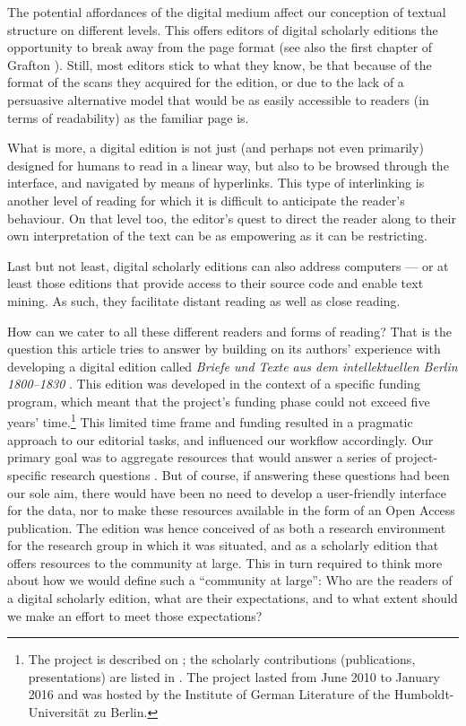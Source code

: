 \begin{paper}
The potential affordances of the digital medium affect our conception of
textual structure on different levels. This offers editors of digital scholarly
editions the opportunity to break away from the
page format (see also the first chapter of Grafton \citeyear{grafton_page_2012}). Still,  most editors stick to what they know, be that because of the format of the
scans they acquired for the edition, or due to the lack of a persuasive alternative model that would be as easily
accessible to readers (in terms of readability) as the familiar page
is.

What is more, a digital edition is not just (and perhaps not even primarily)
designed for humans to read in a linear way, but also to be browsed through the
interface, and navigated by means of hyperlinks. This type of interlinking is
another level of reading for which it is difficult to anticipate  the reader's behaviour. On that level too, the editor's quest to direct the reader
along to their own interpretation of the text can be as empowering as it
can be restricting.

Last but not least, digital scholarly editions can also address computers --- or at
least those editions that provide access to their source code and enable
text mining. As such, they facilitate distant reading as
well as close reading.

How can we cater to all these different readers and forms of reading?
That is the question this article tries to answer by building on its authors' experience with
developing a digital edition called \emph{Briefe und Texte aus dem
intellektuellen Berlin 1800--1830} \citep{baillot_briefe_2010}. This edition
was developed in the context of a specific funding program, which meant that the project's funding phase could not exceed five
years' time.\footnote{The project is described on \citealt{baillot_berliner_nodate}; the scholarly contributions
  (publications, presentations) are listed in \citealt{baillot_emmy_nodate}. The project lasted from June 2010 to
  January 2016 and was hosted by the Institute of German Literature of
  the Humboldt-Universität zu Berlin.} This limited time frame and funding
resulted in a pragmatic approach to our editorial tasks, and influenced our workflow
accordingly. Our primary goal was to aggregate resources that
would answer a series of project-specific research questions
\citep{baillot_berliner_2014}. But of course, if answering these questions had been our sole aim,
there would have been no need to develop a user-friendly interface for the data, nor
to make these resources available in the form of an Open Access publication. The edition was hence
conceived of as both a research environment for the research group in which it was situated, and as a
scholarly edition that offers resources to the community at
large. This in turn required to think more about how we would define such a ``community at large'': Who are the readers of a digital scholarly edition,
what are their expectations, and to what extent should we make an effort to meet those expectations?


\end{paper}
